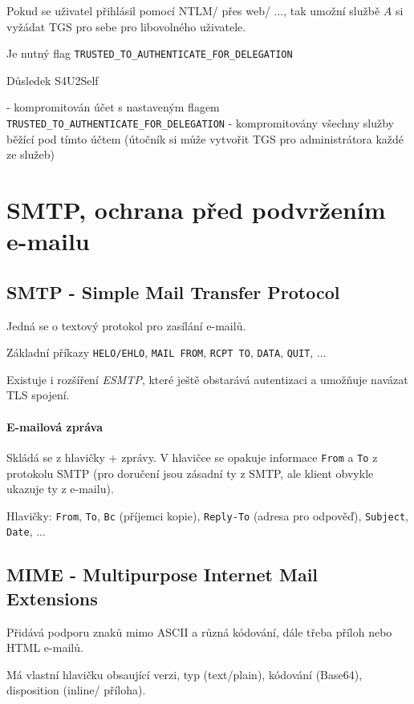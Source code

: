 \documentclass[10pt,a4paper]{article}
\begin{document}
Pokud se uživatel přihlásil pomocí NTLM/ přes web/ ..., tak umožní službě $ A $ si vyžádat TGS pro sebe pro libovolného uživatele.

Je nutný flag \texttt{TRUSTED\_TO\_AUTHENTICATE\_FOR\_DELEGATION}


Důsledek S4U2Self 

- kompromitován účet s nastaveným flagem \texttt{TRUSTED\_TO\_AUTHENTICATE\_FOR\_DELEGATION}
- kompromitovány všechny služby běžící pod tímto účtem (útočník si může vytvořit TGS pro administrátora každé ze služeb)



\section{SMTP, ochrana před podvržením e-mailu}

\subsection{SMTP - Simple Mail Transfer Protocol}
Jedná se o textový protokol pro zasílání e-mailů.

Základní příkazy \texttt{HELO/EHLO}, \texttt{MAIL FROM}, \texttt{RCPT TO}, \texttt{DATA}, \texttt{QUIT}, ...

Existuje i rozšíření \textit{ESMTP}, které ještě obstarává autentizaci a umožňuje navázat TLS spojení.

\paragraph{E-mailová zpráva}
Skládá se z hlavičky + zprávy. V hlavičce se opakuje informace \texttt{From} a \texttt{To} z protokolu SMTP (pro doručení jsou zásadní ty z SMTP, ale klient obvykle ukazuje ty z e-mailu).

Hlavičky: \texttt{From}, \texttt{To}, \texttt{Bc} (příjemci kopie), \texttt{Reply-To} (adresa pro odpověď), \texttt{Subject}, \texttt{Date}, ...

\subsection{MIME - Multipurpose Internet Mail Extensions} 

Přidává podporu znaků mimo ASCII a různá kódování, dále třeba příloh nebo HTML e-mailů.

Má vlastní hlavičku obsaující verzi, typ (text/plain), kódování (Base64), disposition (inline/ příloha).
\end{document}
